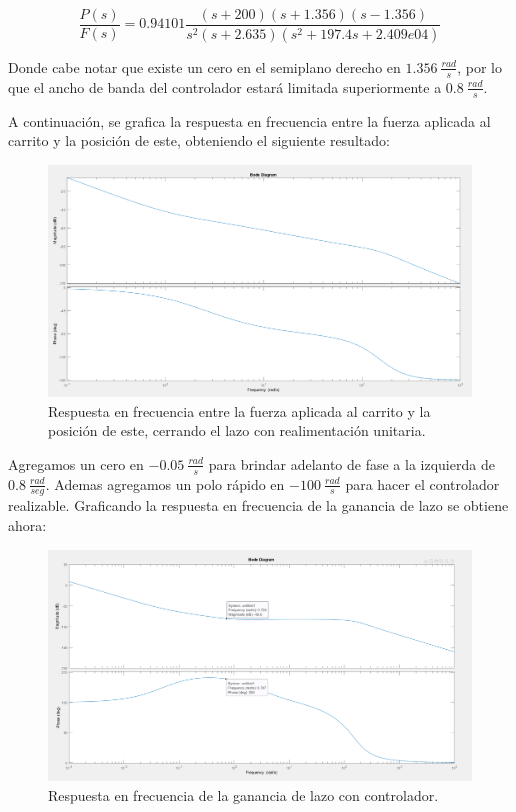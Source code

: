 \begin{equation}
\frac{P(s)}{F(s)} = 0.94101\frac{(s+200)(s+1.356)(s-1.356)}{s^2(s+2.635)(s^2 + 197.4s + 2.409e04)}
\end{equation}

Donde cabe notar que existe un cero en el semiplano derecho en $1.356 \ \frac{rad}{s}$, por lo que el ancho de banda del controlador estará limitada superiormente a $0.8 \ \frac{rad}{s}$.

A continuación, se grafica la respuesta en frecuencia entre la fuerza aplicada al carrito y la posición de este, obteniendo el siguiente resultado:

\begin{figure}[H]
	\centering
	\includegraphics[width=0.8\linewidth]{Imagenes/loopshaping/bode_cerrando_p}
	\caption{Respuesta en frecuencia entre la fuerza aplicada al carrito y la posición de este, cerrando el lazo con realimentación unitaria.}
	\label{bode_cerrando_p}
\end{figure}

Agregamos un cero en $-0.05 \ \frac{rad}{s}$ para brindar adelanto de fase a la izquierda de $0.8 \ \frac{rad}{seg}$. Ademas agregamos un polo rápido en $-100 \ \frac{rad}{s}$ para hacer el controlador realizable. Graficando la respuesta en frecuencia de la ganancia de lazo se obtiene ahora:

\begin{figure}[H]
	\centering
	\includegraphics[width=0.8\linewidth]{Imagenes/loopshaping/bode_cerrando_p_con_controlador}
	\caption{Respuesta en frecuencia de la ganancia de lazo con controlador.}
	\label{bode_cerrando_p_con_controlador}
\end{figure}

